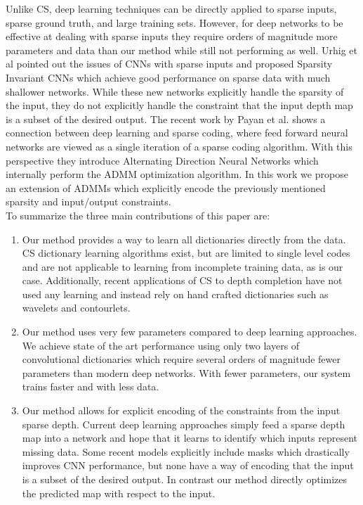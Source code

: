   Unlike CS, deep learning techniques can be directly applied to sparse inputs, sparse ground truth, and large training sets. However, for deep networks to be effective at dealing with sparse inputs they require orders of magnitude more parameters and data than our method while still not performing as well. Urhig et al pointed out the issues of CNNs with sparse inputs and proposed Sparsity Invariant CNNs which achieve good performance on sparse data with much shallower networks. While these new networks explicitly handle the sparsity of the input, they do not explicitly handle the constraint that the input depth map is a subset of the desired output. The recent work by Payan et al.  shows a connection between deep learning and sparse coding, where feed forward neural networks are viewed as a single iteration of a sparse coding algorithm. With this perspective they introduce Alternating Direction Neural Networks which internally perform the ADMM optimization algorithm. In this work we propose an extension of ADMMs which explicitly encode the previously mentioned sparsity and input/output constraints.\\
  To summarize the three main contributions of this paper are:
  \begin{enumerate}
    \item Our method provides a way to learn all dictionaries directly from the data. CS dictionary learning algorithms exist, but are limited to single level codes and are not applicable to learning from incomplete training data, as is our case. Additionally, recent applications of CS to depth completion have not used any learning and instead rely on hand crafted dictionaries such as wavelets and contourlets.
  \item Our method uses very few parameters compared to deep learning approaches. We achieve state of the art performance using only two layers of convolutional dictionaries which require several orders of magnitude fewer parameters than modern deep networks. With fewer parameters, our system trains faster and with less data.
  \item Our method allows for explicit encoding of the constraints from the input sparse depth. Current deep learning approaches simply feed a sparse depth map into a network and hope that it learns to identify which inputs represent missing data. Some recent models explicitly include masks which drastically improves CNN performance, but none have a way of encoding that the input is a subset of the desired output. In contrast our method directly optimizes the predicted map with respect to the input.
  \end{enumerate}
  